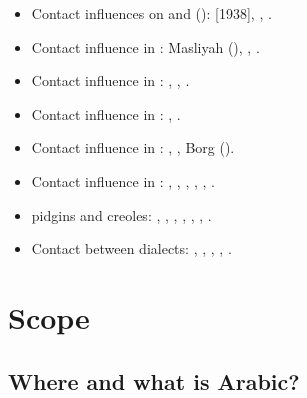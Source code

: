 \documentclass[output=paper]{langsci/langscibook}
\begin{document}
\begin{itemize}[noitemsep,leftmargin=11pt]
\item[\adfhalfrightarrowhead]Contact influences on  and   (): \citet{Jeffrey2007} [1938], \citet{Blau1969}, \citet{Hebbo1984}.

\item[\adfhalfrightarrowhead]Contact influence in  : Masliyah (\citeyear{Masliyah1996,Masliyah1997}), \citet{MatrasShabibi2007}, \citet{ElZarkaZiagos2019}.

\item[\adfhalfrightarrowhead]Contact influence in  : \citet{Jastrow2005}, \citet{Ratcliffe2005}, \citet{Ingham2011afg}.

\item[\adfhalfrightarrowhead]Contact influence in  : \citet{Barbot1961}, \citet{Neishtadt2015}.

\item[\adfhalfrightarrowhead]Contact influence in  : \citet{Newton1964}, \citet{Tsiapera1964}, Borg (\citeyear{Borg1997CMA,Borg2004}).

\item[\adfhalfrightarrowhead]Contact influence in : \citet{colin1957}, \citet{Aquilina1958}, \citet{krier1976},  \citet{mifsudloanverbs}, \citet{brincat2011}, \citet{Souag2018berber}.

\item[\adfhalfrightarrowhead] pidgins and creoles: \citet{Owens1985}, \citet{Miller1993}, \citet{Luffin2014}, \citet{Manfredi2014relex}, \citet{Avram2017article}, \citet{Bizri2018}, \citet{Owens2018}.

\item[\adfhalfrightarrowhead]Contact between  dialects:  \citet{Al-Wer2007}, \citet{Gibson2002}, \citet{Miller2007}, \citet{CotterHoresh2015}, \citet{Leddy-Cecere2018}.

\end{itemize}

\section{Scope}\label{introscope}

\subsection{Where and what is Arabic?}\label{introwherewhat}
\end{document}
